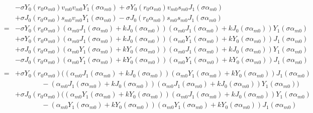 \documentclass{article}
\begin{document}
\begin{eqnarray}
    & & - \sigma Y_0(r_0\alpha_{m0}) v_{m0} v_{m0} Y_1(\sigma\alpha_{m0})
        + \sigma Y_0(r_0\alpha_{m0}) v_{m0} s_{m0} J_1(\sigma\alpha_{m0})
\nonumber\\
    & & + \sigma J_0(r_0\alpha_{m0}) s_{m0} v_{m0} Y_1(\sigma\alpha_{m0})
        - \sigma J_0(r_0\alpha_{m0}) s_{m0} s_{m0} J_1(\sigma\alpha_{m0})
\nonumber\\
    &=& - \sigma Y_0(r_0\alpha_{m0})
          (\alpha_{m0}J_1(\sigma\alpha_{m0}) + kJ_0(\sigma\alpha_{m0}))
          (\alpha_{m0}J_1(\sigma\alpha_{m0}) + kJ_0(\sigma\alpha_{m0}))
          Y_1(\sigma\alpha_{m0}) \nonumber\\
    & & + \sigma Y_0(r_0\alpha_{m0})
          (\alpha_{m0}J_1(\sigma\alpha_{m0}) + kJ_0(\sigma\alpha_{m0}))
          (\alpha_{m0}Y_1(\sigma\alpha_{m0}) + kY_0(\sigma\alpha_{m0}))
          J_1(\sigma\alpha_{m0}) \nonumber\\
    & & + \sigma J_0(r_0\alpha_{m0})
          (\alpha_{m0}Y_1(\sigma\alpha_{m0}) + kY_0(\sigma\alpha_{m0}))
          (\alpha_{m0}J_1(\sigma\alpha_{m0}) + kJ_0(\sigma\alpha_{m0}))
          Y_1(\sigma\alpha_{m0}) \nonumber\\
    & & - \sigma J_0(r_0\alpha_{m0})
          (\alpha_{m0}Y_1(\sigma\alpha_{m0}) + kY_0(\sigma\alpha_{m0}))
          (\alpha_{m0}Y_1(\sigma\alpha_{m0}) + kY_0(\sigma\alpha_{m0}))
          J_1(\sigma\alpha_{m0}) \nonumber\\
\nonumber\\
    &=& + \sigma Y_0(r_0\alpha_{m0})\Big(
          (\alpha_{m0}J_1(\sigma\alpha_{m0}) + kJ_0(\sigma\alpha_{m0}))
          (\alpha_{m0}Y_1(\sigma\alpha_{m0}) + kY_0(\sigma\alpha_{m0}))
          J_1(\sigma\alpha_{m0}) \nonumber\\
    & & \ \ \ \ \ \ \ \ \ \ \ \ \ \ \ \ \ 
        - (\alpha_{m0}J_1(\sigma\alpha_{m0}) + kJ_0(\sigma\alpha_{m0}))
          (\alpha_{m0}J_1(\sigma\alpha_{m0}) + kJ_0(\sigma\alpha_{m0}))
          Y_1(\sigma\alpha_{m0})
          \Big) \nonumber\\
    & & + \sigma J_0(r_0\alpha_{m0})\Big(
          (\alpha_{m0}Y_1(\sigma\alpha_{m0}) + kY_0(\sigma\alpha_{m0}))
          (\alpha_{m0}J_1(\sigma\alpha_{m0}) + kJ_0(\sigma\alpha_{m0}))
          Y_1(\sigma\alpha_{m0}) \nonumber\\
    & & \ \ \ \ \ \ \ \ \ \ \ \ \ \ \ \ \ 
        - (\alpha_{m0}Y_1(\sigma\alpha_{m0}) + kY_0(\sigma\alpha_{m0}))
          (\alpha_{m0}Y_1(\sigma\alpha_{m0}) + kY_0(\sigma\alpha_{m0}))
          J_1(\sigma\alpha_{m0})

\end{eqnarray}
\end{document}
